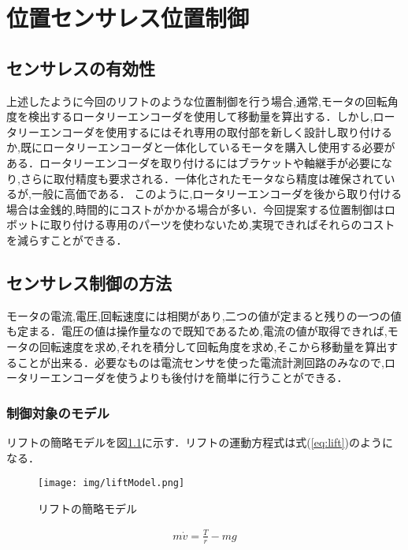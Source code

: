 \chapter{位置センサレス位置制御}

\section{センサレスの有効性}上述したように今回のリフトのような位置制御を行う場合,通常,モータの回転角度を検出するロータリーエンコーダを使用して移動量を算出する．しかし,ロータリーエンコーダを使用するにはそれ専用の取付部を新しく設計し取り付けるか,既にロータリーエンコーダと一体化しているモータを購入し使用する必要がある．ロータリーエンコーダを取り付けるにはブラケットや軸継手が必要になり,さらに取付精度も要求される．一体化されたモータなら精度は確保されているが,一般に高価である．
このように,ロータリーエンコーダを後から取り付ける場合は金銭的,時間的にコストがかかる場合が多い．今回提案する位置制御はロボットに取り付ける専用のパーツを使わないため,実現できればそれらのコストを減らすことができる．

\section{センサレス制御の方法}
モータの電流,電圧,回転速度には相関があり,二つの値が定まると残りの一つの値も定まる．電圧の値は操作量なので既知であるため,電流の値が取得できれば,モータの回転速度を求め,それを積分して回転角度を求め,そこから移動量を算出することが出来る．必要なものは電流センサを使った電流計測回路のみなので,ロータリーエンコーダを使うよりも後付けを簡単に行うことができる．

\subsection{制御対象のモデル}
リフトの簡略モデルを図\ref{fig:liftModel}に示す．リフトの運動方程式は式(\ref{eq:lift})のようになる．

\begin{figure}[htbp]
  \begin{center}
    \texttt{[image: img/liftModel.png]}
    \end{center}
  \caption{リフトの簡略モデル}
 \label{fig:liftModel}
\end{figure}

\begin{eqnarray}
m\dot{v}=\frac{T}{r}-mg\\
\label{eq:lift}
\end{eqnarray}

